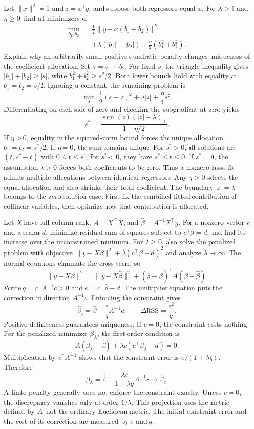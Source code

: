 Let $\|x\|^2=1$ and $z=x^\top y$, and suppose both regressors equal $x$. For $\lambda>0$ and $\eta\ge0$, find all minimizers of
\[
 \begin{aligned}
 \min_{b_1,b_2}\quad&\frac12\|y-x(b_1+b_2)\|^2\\
 &+\lambda(|b_1|+|b_2|)+\frac\eta2(b_1^2+b_2^2).
 \end{aligned}
\]
Explain why an arbitrarily small positive quadratic penalty changes uniqueness of the coefficient allocation.
\solution Set $s=b_1+b_2$. For fixed $s$, the triangle inequality gives $|b_1|+|b_2|\ge|s|$, while $b_1^2+b_2^2\ge s^2/2$. Both lower bounds hold with equality at $b_1=b_2=s/2$. Ignoring a constant, the remaining problem is
\[
 \min_s\ \frac12(s-z)^2+\lambda|s|+\frac\eta4s^2.
\]
Differentiating on each side of zero and checking the subgradient at zero yields
\[
 s^*=\frac{\operatorname{sign}(z)(|z|-\lambda)_+}{1+\eta/2}.
\]
If $\eta>0$, equality in the squared-norm bound forces the unique allocation $b_1=b_2=s^*/2$. If $\eta=0$, the sum remains unique. For $s^*>0$, all solutions are $(t,s^*-t)$ with $0\le t\le s^*$; for $s^*<0$, they have $s^*\le t\le0$. If $s^*=0$, the assumption $\lambda>0$ forces both coefficients to be zero.
Thus a nonzero lasso fit admits multiple allocations between identical regressors. Any $\eta>0$ selects the equal allocation and also shrinks their total coefficient. The boundary $|z|=\lambda$ belongs to the zero-solution case.
\insight First fix the combined fitted contribution of collinear variables, then optimize how that contribution is allocated.

Let $X$ have full column rank, $A=X^\top X$, and $\widehat\beta=A^{-1}X^\top y$. For a nonzero vector $c$ and a scalar $d$, minimize residual sum of squares subject to $c^\top\beta=d$, and find its increase over the unconstrained minimum. For $\lambda\ge0$, also solve the penalized problem with objective $\|y-X\beta\|^2+\lambda(c^\top\beta-d)^2$ and analyze $\lambda\to\infty$.
\solution The normal equations eliminate the cross term, so
\[
 \|y-X\beta\|^2=\|y-X\widehat\beta\|^2
 +(\beta-\widehat\beta)^\top A(\beta-\widehat\beta).
\]
Write $q=c^\top A^{-1}c>0$ and $e=c^\top\widehat\beta-d$. The multiplier equation puts the correction in direction $A^{-1}c$. Enforcing the constraint gives
\[
 \boxed{\widehat\beta_c=\widehat\beta-\frac e q A^{-1}c},
 \qquad \Delta\mathrm{RSS}=\frac{e^2}{q}.
\]
Positive definiteness guarantees uniqueness. If $e=0$, the constraint costs nothing.
For the penalized minimizer $\beta_\lambda$, the first-order condition is
\[
 A(\beta_\lambda-\widehat\beta)
 +\lambda c(c^\top\beta_\lambda-d)=0.
\]
Multiplication by $c^\top A^{-1}$ shows that the constraint error is $e/(1+\lambda q)$. Therefore
\[
 \beta_\lambda=\widehat\beta-
 \frac{\lambda e}{1+\lambda q}A^{-1}c
 \longrightarrow\widehat\beta_c.
\]
A finite penalty generally does not enforce the constraint exactly. Unless $e=0$, the discrepancy vanishes only at order $1/\lambda$.
\insight This projection uses the metric defined by $A$, not the ordinary Euclidean metric. The initial constraint error and the cost of its correction are measured by $e$ and $q$.


